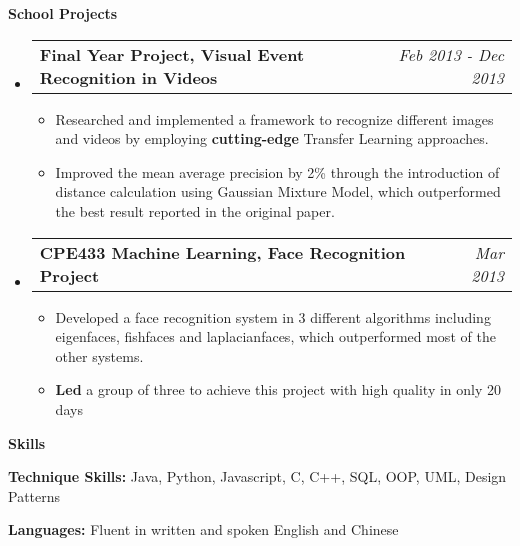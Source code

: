 \documentclass[a4paper,12pt]{article}
\makeatletter
\newcommand{\resitem}[1]{\item #1 \vspace{-2pt}}
\newcommand{\resheading}[1]{{\large {\begin{minipage}{\textwidth}{\textbf{#1 \vphantom{p\^{E}}}}\end{minipage}}}}
\newcommand{\projectsubheading}[2]{
\begin{tabular*}{6.3in}{l@{\extracolsep{\fill}}r}
		\textbf{#1} & \textit{#2} \\
\end{tabular*}\vspace{-6pt}}
\makeatother
\begin{document}
\resheading {School Projects}
\begin{itemize}
\item
	\projectsubheading {Final Year Project, Visual Event Recognition in Videos}{Feb 2013 - Dec 2013}
	\begin{itemize}
		\resitem {Researched and implemented a framework to recognize different images and videos by employing \textbf{cutting-edge} Transfer Learning approaches.}
		\resitem {Improved the mean average precision by 2\% through the introduction of distance calculation using Gaussian Mixture Model, which outperformed the best result reported in the original paper.}

	\end{itemize}

\item
	\projectsubheading {CPE433 Machine Learning, Face Recognition Project}{Mar 2013}
	\begin{itemize}
		\resitem {Developed a face recognition system in 3 different algorithms including eigenfaces, fishfaces and laplacianfaces, which outperformed most of the other systems.}
		\resitem {\textbf{Led} a group of three to achieve this project with high quality in only 20 days}
	\end{itemize}
\end{itemize}

\resheading{Skills}
\begin{description}
\item{\bf Technique Skills: }Java, Python, Javascript, C, C++, SQL, OOP, UML, Design Patterns

\item{\bf Languages: }Fluent in written and spoken English and Chinese
\end{description}
\end{document}
